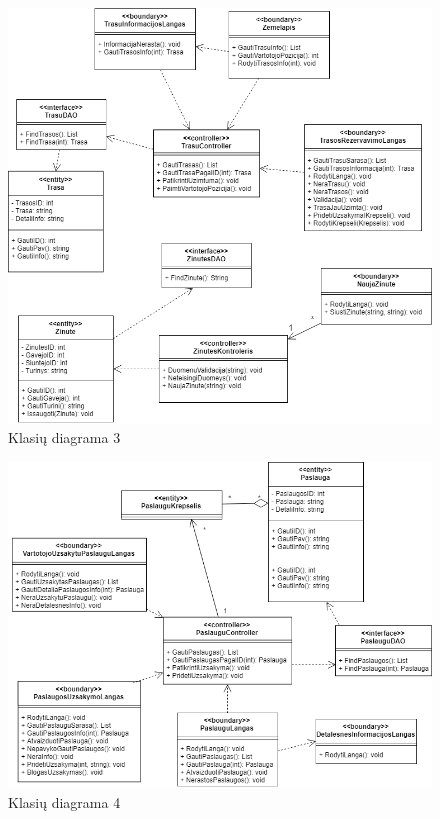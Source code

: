 \documentclass[oneside]{VUMIFPSkursinis}
\begin{document}
			\begin{figure}[h]
    				\centering
    				\includegraphics[width=1\textwidth]{classC.png}
    				\caption{Klasių diagrama 3}
    				\label{fig:KlasiuDiagrama}
			\end{figure}
			\begin{figure}[h]
    				\centering
    				\includegraphics[width=1\textwidth]{classD.png}
    				\caption{Klasių diagrama 4}
    				\label{fig:KlasiuDiagrama}
			\end{figure}
\end{document}
